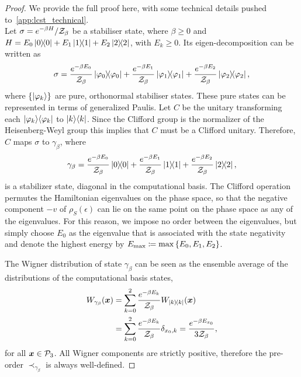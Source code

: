 \documentclass[pra,
aps,
twocolumn,
superscriptaddress,
groupedaddress,
nofootinbib,
reprint
]{revtex4-1}
\begin{document}
\begin{proof}
	We provide the full proof here, with some technical details pushed to~\cref{app:lcst_technical}.\\

Let $\displaystyle \sigma = e^{-\beta H} / \mathcal{Z}_\beta$ be a stabiliser state, where $\beta \geq 0$ and $H = E_0 \ketbra{0} + E_1 \ketbra{1} + E_2 \ketbra{2}$, with $E_k \geq 0$.
Its eigen-decomposition can be written as 
\begin{equation}
	\sigma = \frac{e^{-\beta E_0}}{\mathcal{Z}_\beta} \ketbra{\varphi_0} + \frac{e^{-\beta E_1}}{\mathcal{Z}_\beta} \ketbra{\varphi_1} + \frac{e^{-\beta E_2}}{\mathcal{Z}_\beta} \ketbra{\varphi_2},
\end{equation}
where $\{\ket{\varphi_k}\}$ are pure, orthonormal stabiliser states. These pure states can be represented in terms of generalized Paulis. Let $C$ be the unitary transforming each $|\varphi_k\rangle\langle\varphi_k|$ to $|k\rangle\langle k|$. Since the Clifford group is the normalizer of the Heisenberg-Weyl group this implies that $C$ must be a Clifford unitary. Therefore, $C$ maps $\sigma$ to $\gamma_\beta$, where 
\begin{equation}
\gamma_\beta = \frac{e^{-\beta E_0}}{\mathcal{Z}_\beta} \ketbra{0} + \frac{e^{-\beta E_1}}{\mathcal{Z}_\beta} \ketbra{1} + \frac{e^{-\beta E_2}}{\mathcal{Z}_\beta} \ketbra{2},
\end{equation}
is a stabilizer state, diagonal in the computational basis. The Clifford operation permutes the Hamiltonian eigenvalues on the phase space, so that the negative component $-v$ of $\rho_S(\epsilon)$ can lie on the same point on the phase space as any of the eigenvalues.
For this reason, we impose no order between the eigenvalues, but simply choose $E_0$ as the eigenvalue that is associated with the state negativity and denote the highest energy by $E_{\rm{max}} \coloneqq \max{\{E_0, E_1, E_2\}}$.

The Wigner distribution of state $\gamma_\beta$ can be seen as the ensemble average of the distributions of the computational basis states,
\begin{align}
	\W[\bmx]{\gamma_\beta} &= \sum\limits_{k=0}^2 \frac{e^{-\beta E_k}}{\Z_\beta}\W[\bmx]{\ketbra{k}} \nonumber\\
	&= \sum\limits_{k=0}^2 \frac{e^{-\beta E_k}}{\Z_\beta} \delta_{x_0, k} = \frac{e^{-\beta E_{x_0}}}{3\Z_\beta},
\end{align}
for all $\bm{x} \in \mathcal{P}_3$. 
All Wigner components are strictly positive, therefore the pre-order $\prec_{\gamma_\beta}$ is always well-defined.


\end{proof}
\end{document}
